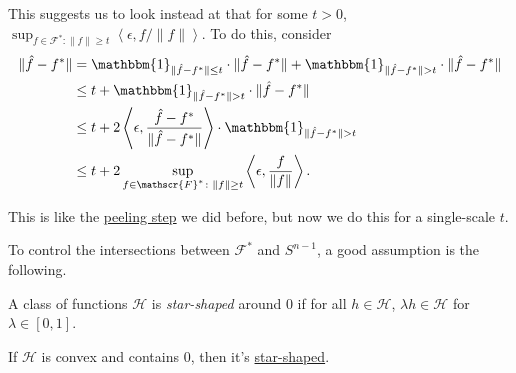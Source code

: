 This suggests us to look instead at that for some \(t > 0\), \(\sup _{f\in \mathscr{F} ^{\ast} \colon \lVert f \rVert \geq t} \left\langle \epsilon , f / \lVert f \rVert \right\rangle \). To do this, consider
\[
	\begin{split}
		\lVert \hat{f} - f^{\ast} \rVert
		 & = \mathbbm{1}_{\lVert \hat{f} - f^{\ast} \rVert \leq t} \cdot \lVert \hat{f} - f^{\ast} \rVert + \mathbbm{1}_{\lVert \hat{f} - f^{\ast} \rVert > t} \cdot \lVert \hat{f} - f^{\ast} \rVert \\
		 & \leq t + \mathbbm{1}_{\lVert \hat{f} - f^{\ast} \rVert > t} \cdot \lVert \hat{f} - f^{\ast} \rVert                                                                                         \\
		 & \leq t + 2 \left\langle \epsilon , \frac{\hat{f} - f^{\ast} }{\lVert \hat{f} - f^{\ast} \rVert } \right\rangle \cdot \mathbbm{1}_{\lVert \hat{f} - f^{\ast} \rVert > t}                    \\
		 & \leq t + 2 \sup _{\substack{f \in\mathscr{F} ^{\ast} \colon \lVert f \rVert \geq t}} \left\langle \epsilon , \frac{f}{\lVert f \rVert } \right\rangle .
	\end{split}
\]

\begin{intuition}
	This is like the \hyperref[eq:peeling-step]{peeling step} we did before, but now we do this for a single-scale \(t\).
\end{intuition}

To control the intersections between \(\mathscr{F} ^{\ast} \) and \(S^{n-1}\), a good assumption is the following.

\begin{definition}\label{def:star-shaped}
	A class of functions \(\mathscr{H} \) is \emph{star-shaped} around \(0\) if for all \(h \in \mathscr{H} \), \(\lambda h \in \mathscr{H} \) for \(\lambda \in [0, 1]\).
\end{definition}

\begin{eg}
	If \(\mathscr{H} \) is convex and contains \(0\), then it's \hyperref[def:star-shaped]{star-shaped}.
\end{eg}

